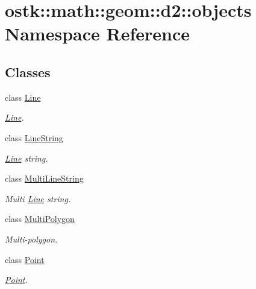 \hypertarget{namespaceostk_1_1math_1_1geom_1_1d2_1_1objects}{}\section{ostk\+:\+:math\+:\+:geom\+:\+:d2\+:\+:objects Namespace Reference}
\label{namespaceostk_1_1math_1_1geom_1_1d2_1_1objects}
\subsection*{Classes}
\begin{DoxyCompactItemize}
\item 
class \hyperlink{classostk_1_1math_1_1geom_1_1d2_1_1objects_1_1_line}{Line}
\begin{DoxyCompactList}\small\item\em \hyperlink{classostk_1_1math_1_1geom_1_1d2_1_1objects_1_1_line}{Line}. \end{DoxyCompactList}\item 
class \hyperlink{classostk_1_1math_1_1geom_1_1d2_1_1objects_1_1_line_string}{Line\+String}
\begin{DoxyCompactList}\small\item\em \hyperlink{classostk_1_1math_1_1geom_1_1d2_1_1objects_1_1_line}{Line} string. \end{DoxyCompactList}\item 
class \hyperlink{classostk_1_1math_1_1geom_1_1d2_1_1objects_1_1_multi_line_string}{Multi\+Line\+String}
\begin{DoxyCompactList}\small\item\em Multi \hyperlink{classostk_1_1math_1_1geom_1_1d2_1_1objects_1_1_line}{Line} string. \end{DoxyCompactList}\item 
class \hyperlink{classostk_1_1math_1_1geom_1_1d2_1_1objects_1_1_multi_polygon}{Multi\+Polygon}
\begin{DoxyCompactList}\small\item\em Multi-\/polygon. \end{DoxyCompactList}\item 
class \hyperlink{classostk_1_1math_1_1geom_1_1d2_1_1objects_1_1_point}{Point}
\begin{DoxyCompactList}\small\item\em \hyperlink{classostk_1_1math_1_1geom_1_1d2_1_1objects_1_1_point}{Point}. \end{DoxyCompactList}\item 

\end{DoxyCompactItemize}
